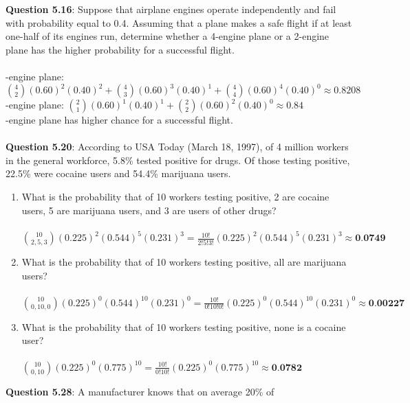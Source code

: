 \documentclass{article}
\begin{document}
    \textbf{Question 5.16}: Suppose that airplane engines operate independently 
    and fail with probability equal to 0.4. Assuming
    that a plane makes a safe flight if at least one-half of its
    engines run, determine whether a 4-engine plane or a 2-engine 
    plane has the higher probability for a successful
    flight.\\\\
        -engine plane:
        \indent $\binom{4}{2}(0.60)^{2}(0.40)^{2} + \binom{4}{3}(0.60)^{3}(0.40)^{1} + \binom{4}{4}(0.60)^{4}(0.40)^{0} \approx 0.8208$\\
        -engine plane:
        \indent $\binom{2}{1}(0.60)^{1}(0.40)^{1} + \binom{2}{2}(0.60)^{2}(0.40)^{0} \approx 0.84$\\
        -engine plane has higher chance for a successful flight.\\\\
    \textbf{Question 5.20}: According to USA Today (March 18, 1997), of 4
    million workers in the general workforce, 5.8\% tested
    positive for drugs. Of those testing positive, 22.5\%
    were cocaine users and 54.4\% marijuana users.
        \begin{enumerate}[label = (\alph*)]
            \item What is the probability that of 10 workers testing
            positive, 2 are cocaine users, 5 are marijuana users,
            and 3 are users of other drugs?\\\\
                \indent $\binom{10}{2,5,3}(0.225)^{2}(0.544)^{5}(0.231)^{3} = \frac{10!}{2!5!3!}(0.225)^{2}(0.544)^{5}(0.231)^{3} \approx \textbf{0.0749}$
            \item What is the probability that of 10 workers testing
            positive, all are marijuana users?\\\\
                \indent $\binom{10}{0,10,0}(0.225)^{0}(0.544)^{10}(0.231)^{0} = \frac{10!}{0!10!0!}(0.225)^{0}(0.544)^{10}(0.231)^{0} \approx \textbf{0.00227}$
            \item What is the probability that of 10 workers testing
            positive, none is a cocaine user?\\\\
                \indent $\binom{10}{0,10}(0.225)^{0}(0.775)^{10} = \frac{10!}{0!10!}(0.225)^{0}(0.775)^{10} \approx \textbf{0.0782}$
        \end{enumerate}
    \textbf{Question 5.28}: A manufacturer knows that on average 20\% of
\end{document}
